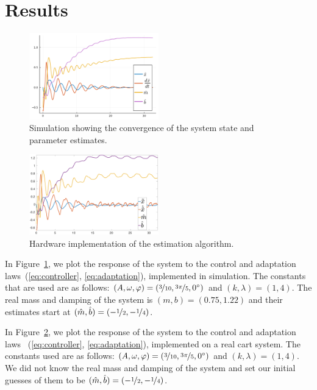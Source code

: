 \section{Results}
\label{sec:results}

\begin{figure}[b]
  \centering
  \includegraphics[width=0.5\textwidth]{./figures/adaptationrule1.pdf}
  \caption{Simulation showing the convergence of the system state and parameter
  estimates.}
  \label{fig:adaptation}
\end{figure}

\begin{figure}[b!]
  \centering
  \includegraphics[width=0.5\textwidth]{./figures/station2_adaptation.eps}
  \caption{Hardware implementation of the estimation algorithm.}
  \label{fig:hardware}
\end{figure}

In Figure~\ref{fig:adaptation}, we plot the response of the system to the
control and adaptation laws~(\ref{eq:controller}, \ref{eq:adaptation}),
implemented in simulation. The constants that are used are as follows: $(A,
\omega, \varphi) = (\nicefrac{3}{10}, \nicefrac{3\pi}{5}, 0^\circ)$ and $(k,
\lambda) = (1, 4)$. The real mass and damping of the system is $(m, b) = (0.75,
1.22)$ and their estimates start at $(\hat{m}, \hat{b}) = (-\nicefrac{1}{2},
-\nicefrac{1}{4})$.

In Figure~\ref{fig:hardware}, we plot the response of the system to the control
and adaptation laws ~(\ref{eq:controller}, \ref{eq:adaptation}), implemented on
a real cart system. The constants used are as follows: $(A, \omega, \varphi) =
(\nicefrac{3}{10}, \nicefrac{3\pi}{5}, 0^\circ)$ and $(k, \lambda) = (1, 4)$. We
did not know the real mass and damping of the system and set our initial guesses
of them to be $(\hat{m}, \hat{b}) = (-\nicefrac{1}{2}, -\nicefrac{1}{4})$.

